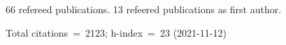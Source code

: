 66 refereed publications. 13 refeered publications as first author.

Total citations~=~2123; h-index~=~23 (2021-11-12)